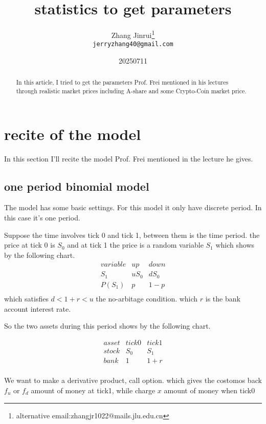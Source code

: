 \documentclass{article}
\title{statistics to get parameters}
\author{Zhang Jinrui\thanks{alternative email:zhangjr1022@mails.jlu.edu.cn} \\ \texttt{jerryzhang40@gmail.com}}
\date{20250711}  %
\theoremstyle{definition} %
\begin{document}
\maketitle

\begin{abstract}
    In this article, I tried to get the parameters
    Prof. Frei mentioned in his lectures through
    realistic market prices including A-share and
    some Crypto-Coin market price.
\end{abstract}

\section{recite of the model}
In this section I'll recite the model
Prof. Frei mentioned in the lecture he
gives.

\subsection{one period binomial model}
The model has some basic settings.
For this model it only have discrete
period. In this case it's one period.

Suppose the time involves tick 0 and tick 1,
between them is the time period.
the price at tick 0 is $S_0$
and at tick 1 the price is a random variable
$S_1$ which shows by the following chart.
$$
    \begin{array}{c|ccc}
        variable & up   & down \\
        S_1      & uS_0 & dS_0 \\
        \hline
        P(S_1)   & p    & 1-p  \\
    \end{array}
$$
which satisfies $d<1+r<u$ the no-arbitage condition.
which $r$ is the bank account interest rate.

So the two assets during this period shows by
the following chart.

$$
    \begin{array}{c|ccc}
        asset & tick0 & tick1 \\
        stock & S_0   & S_1   \\
        \hline
        bank  & 1     & 1+r   \\
    \end{array}
$$

We want to make a derivative product,
call option.
which gives the costomos back $f_u$
or $f_d$ amount of money at tick1, while charge
$x$ amount of money when tick0
\end{document}
